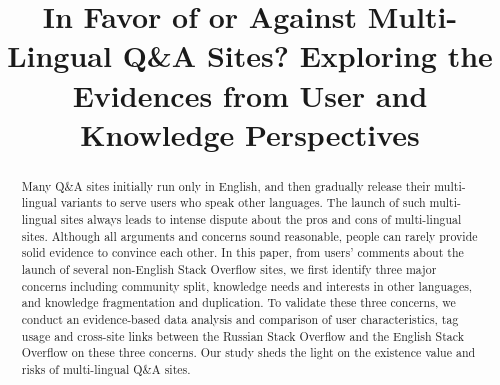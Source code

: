 \documentclass[format=acmsmall, review=false, screen=true, anonymous=true, table]{acmart}
\begin{document}



\title[Multi-lingual Stack Overflow]{In Favor of or Against Multi-Lingual Q\&A Sites? Exploring the Evidences from User and Knowledge Perspectives}
	
\begin{abstract}
Many Q\&A sites initially run only in English, and then gradually release their multi-lingual variants to serve users who speak other languages.
The launch of such multi-lingual sites always leads to intense dispute about the pros and cons of multi-lingual sites.
Although all arguments and concerns sound reasonable, people can rarely provide solid evidence to convince each other.
In this paper, from users' comments about the launch of several non-English Stack Overflow sites, we first identify three major concerns including community split, knowledge needs and interests in other languages, and knowledge fragmentation and duplication.
To validate these three concerns, we conduct an evidence-based data analysis and comparison of user characteristics, tag usage and cross-site links between the Russian Stack Overflow and the English Stack Overflow on these three concerns.
Our study sheds the light on the existence value and risks of multi-lingual Q\&A sites.

       
\end{abstract}
\end{document}
